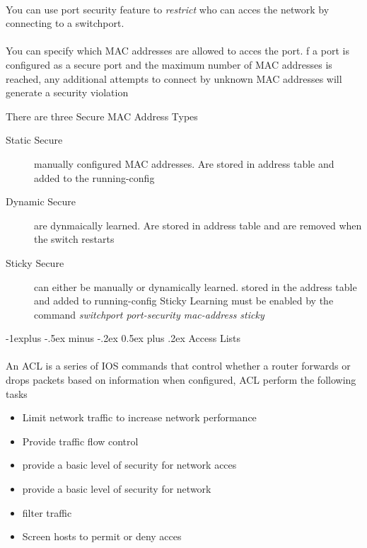 \documentclass[10pt,landscape]{article}
\makeatletter
\renewcommand{\subsection}{\@startsection{subsection}{2}{0mm}%
                                {-1explus -.5ex minus -.2ex}%
                                {0.5ex plus .2ex}%
                                {\normalfont\normalsize\bfseries}}
\makeatother
\begin{document}
\begin{multicols}{3}
\paragraph{}
You can use port security feature to \textit{restrict} who can acces the network by connecting to a switchport.
\paragraph{}
You can specify which MAC addresses are allowed to acces the port. f a port is configured as a secure port and the maximum number of MAC addresses is reached, any additional attempts to connect by unknown MAC addresses will generate a security violation

There are three Secure MAC Address Types
\begin{description}
	\item[Static Secure ] manually configured MAC addresses. Are stored in address table and added to the running-config
	\item[Dynamic Secure] are dynmaically learned. Are stored in address table and are removed when the switch restarts
	\item[Sticky Secure] can either be manually or dynamically learned. stored in the address table and added to running-config Sticky Learning must be enabled by the command \textit{switchport port-security mac-address sticky}
\end{description}

\subsection{Access Lists}
\paragraph{}
An ACL is a series of IOS commands that control whether a router forwards or drops packets based on information
when configured, ACL perform the following tasks
\begin{itemize}
	\item Limit network traffic to increase network performance
	\item Provide traffic flow control
	\item provide a basic level of security for network acces
	\item provide a basic level of security for network
	\item filter traffic
	\item Screen hosts to permit or deny acces
\end{itemize}

\end{multicols}
\end{document}
